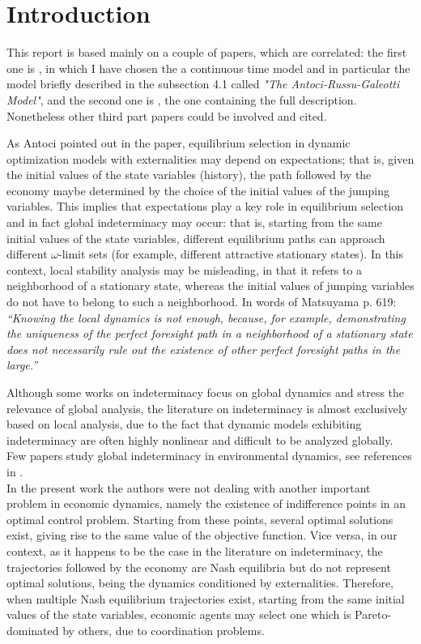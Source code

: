 \section{Introduction}\label{Sec:introduction} 
This report is based mainly on a couple of papers, which are correlated: the first one is \cite{caravaggio_nonlinear_2018}, in which I have chosen the a continuous time model and in particular the model briefly described in the subsection 4.1 called \textit{"The Antoci-Russu-Galeotti Model"}, and the second one is \cite{antoci_poverty_2011}, the one containing the full description. Nonetheless other third part papers could be involved and cited. 

As Antoci \cite{antoci_poverty_2011} pointed out in the paper, equilibrium selection in dynamic optimization models with externalities may depend on expectations; that is, given the initial values of the state variables (history), the path followed by the economy maybe determined by the choice of the initial values of the jumping variables. This implies that expectations play a key role in equilibrium selection and in fact global indeterminacy may occur: that is, starting from the same initial values of the state variables, different equilibrium paths can approach different $\omega$-limit sets (for example, different attractive stationary states). In this context, local stability analysis may be misleading, in that it refers to a neighborhood of a stationary state, whereas the initial values of jumping variables do not have to belong to such a neighborhood. In words of Matsuyama \cite{matsuyama_increasing_1991} p. 619:
\textit{“Knowing the local dynamics is not enough, because, for example, demonstrating the uniqueness of the perfect foresight path in a neighborhood of a stationary state does not necessarily rule out the existence of other perfect foresight paths in the large.”}

Although some works on indeterminacy focus on global dynamics and stress the relevance of global analysis, the literature on indeterminacy is almost exclusively based on local analysis, due to the fact that dynamic models exhibiting indeterminacy are often highly nonlinear and difficult to be analyzed globally. Few papers study global indeterminacy in environmental dynamics, see references in \cite{antoci_poverty_2011}. \\
In the present work the authors were not dealing with another important problem in economic dynamics, namely the existence of indifference points in an optimal control problem. Starting from these points, several optimal solutions exist, giving rise to the same value of the objective function. Vice versa, in our context, as it happens to be the case in the literature on indeterminacy, the trajectories followed by the economy are Nash equilibria but do not represent optimal solutions, being the dynamics conditioned by externalities. Therefore, when multiple Nash equilibrium trajectories exist, starting from the same initial values of the state variables, economic agents may select one which is Pareto-dominated by others, due to coordination problems.

